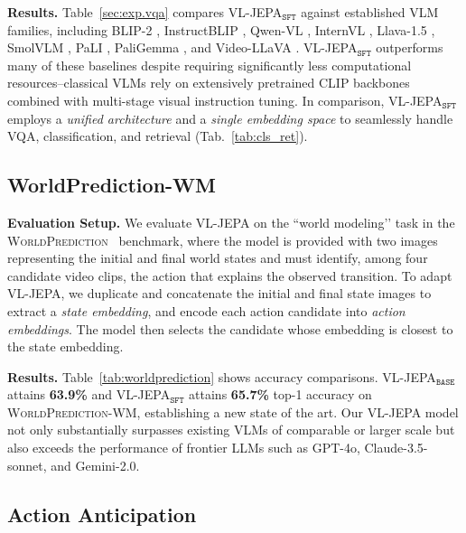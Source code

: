 \textbf{Results.} Table~\ref{sec:exp.vqa} compares VL-JEPA$_\texttt{SFT}$ against established VLM families, including BLIP-2 \citep{li2023blip}, InstructBLIP \citep{dai2023instructblip}, Qwen-VL \citep{bai2023qwen}, InternVL \citep{chen2024internvl}, Llava-1.5 \citep{vallaeys2024improved}, SmolVLM \citep{marafioti2025smolvlm}, PaLI \citep{chen2022pali}, PaliGemma \citep{beyer2024paligemma}, and Video-LLaVA \citep{lin2024video}. VL-JEPA$_\texttt{SFT}$ outperforms many of these baselines despite requiring significantly less computational resources--classical VLMs rely on extensively pretrained CLIP backbones combined with multi-stage visual instruction tuning. In comparison, VL-JEPA$_\texttt{SFT}$ employs a \textit{unified architecture} and a \textit{single embedding space} to seamlessly handle VQA, classification, and retrieval (Tab.~\ref{tab:cls_ret}).




\subsection{WorldPrediction-WM} 
\label{sec:exp.worldprediction}


\textbf{Evaluation Setup.} We evaluate VL-JEPA on the ``world modeling’’ task in the \textsc{WorldPrediction}~\citep{chen2025worldprediction} benchmark, where the model is provided with two images representing the initial and final world states and must identify, among four candidate video clips, the action that explains the observed transition. To adapt VL-JEPA, we duplicate and concatenate the initial and final state images to extract a \textit{state embedding}, and encode each action candidate into \textit{action embeddings}. The model then selects the candidate whose embedding is closest to the state embedding.

\textbf{Results.} Table~\ref{tab:worldprediction} shows accuracy comparisons. {VL-JEPA$_\texttt{BASE}$ attains \textbf{63.9\%} and VL-JEPA$_\texttt{SFT}$ attains \textbf{65.7\%}} top-1 accuracy on \textsc{WorldPrediction}-WM, establishing a new state of the art. Our VL-JEPA model not only substantially surpasses existing VLMs of comparable or larger scale but also exceeds the performance of frontier LLMs such as GPT-4o, Claude-3.5-sonnet, and Gemini-2.0. 

\subsection{Action Anticipation}

